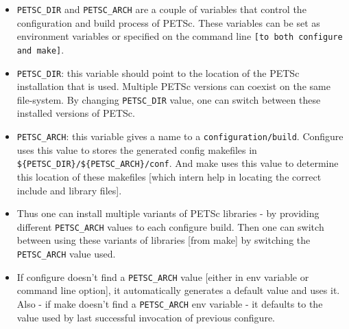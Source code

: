 \documentclass{article}
\begin{document}
\begin{itemize}
\item \verb+PETSC_DIR+ and \verb+PETSC_ARCH+ are a couple of variables that control the configuration and build process of PETSc. These variables can be set as environment variables or specified on the command line \verb+[to both configure and make]+.
\item \verb+PETSC_DIR+: this variable should point to the location of the PETSc installation that is used. Multiple PETSc versions can coexist on the same file-system. By changing \verb+PETSC_DIR+ value, one can switch between these installed versions of PETSc.
\item \verb+PETSC_ARCH+: this variable gives a name to a \verb+configuration/build+. Configure uses this value to stores the generated config makefiles in \verb+${PETSC_DIR}/${PETSC_ARCH}/conf+. And make uses this value to determine this location of these makefiles [which intern help in locating the correct include and library files].
\item Thus one can install multiple variants of PETSc libraries - by providing different \verb+PETSC_ARCH+ values to each configure build. Then one can switch between using these variants of libraries [from make] by switching the \verb+PETSC_ARCH+ value used.
\item If configure doesn't find a \verb+PETSC_ARCH+ value [either in env variable or command line option], it automatically generates a default value and uses it. Also - if make doesn't find a \verb+PETSC_ARCH+ env variable - it defaults to the value used by last successful invocation of previous configure. 
\end{itemize}
\end{document}
